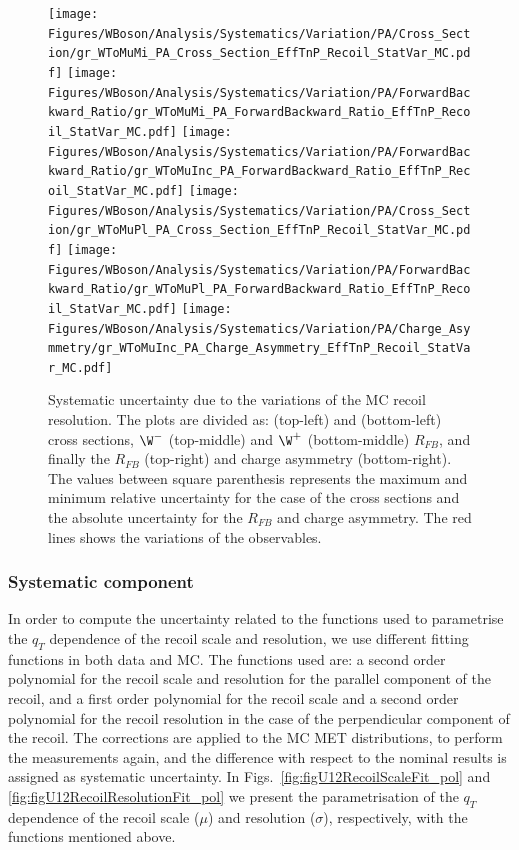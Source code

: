 \begin{figure}[!htbp]
 \begin{center}
  \texttt{[image: Figures/WBoson/Analysis/Systematics/Variation/PA/Cross\_Section/gr\_WToMuMi\_PA\_Cross\_Section\_EffTnP\_Recoil\_StatVar\_MC.pdf]}
  \texttt{[image: Figures/WBoson/Analysis/Systematics/Variation/PA/ForwardBackward\_Ratio/gr\_WToMuMi\_PA\_ForwardBackward\_Ratio\_EffTnP\_Recoil\_StatVar\_MC.pdf]}
  \texttt{[image: Figures/WBoson/Analysis/Systematics/Variation/PA/ForwardBackward\_Ratio/gr\_WToMuInc\_PA\_ForwardBackward\_Ratio\_EffTnP\_Recoil\_StatVar\_MC.pdf]}
  \texttt{[image: Figures/WBoson/Analysis/Systematics/Variation/PA/Cross\_Section/gr\_WToMuPl\_PA\_Cross\_Section\_EffTnP\_Recoil\_StatVar\_MC.pdf]}
  \texttt{[image: Figures/WBoson/Analysis/Systematics/Variation/PA/ForwardBackward\_Ratio/gr\_WToMuPl\_PA\_ForwardBackward\_Ratio\_EffTnP\_Recoil\_StatVar\_MC.pdf]}
  \texttt{[image: Figures/WBoson/Analysis/Systematics/Variation/PA/Charge\_Asymmetry/gr\_WToMuInc\_PA\_Charge\_Asymmetry\_EffTnP\_Recoil\_StatVar\_MC.pdf]}
 \end{center}
 \caption{Systematic uncertainty due to the variations of the MC recoil resolution. The plots are divided as: \WToMuNuMi (top-left) and \WToMuNuPl (bottom-left) cross sections, $\W^{-}$ (top-middle) and $\W^{+}$ (bottom-middle) $R_{FB}$, and finally the \W $R_{FB}$ (top-right) and \W charge asymmetry (bottom-right). The values between square parenthesis represents the maximum and minimum relative uncertainty for the case of the cross sections and the absolute uncertainty for the $R_{FB}$ and charge asymmetry. The red lines shows the variations of the observables.}
 \label{fig:Recoil_StatVar_MC}
\end{figure}


\clearpage
\subsubsection{Systematic component}

In order to compute the uncertainty related to the functions used to parametrise the $q_{T}$ dependence of the recoil scale and resolution, we use different fitting functions in both data and MC. The functions used are: a second order polynomial for the recoil scale and resolution for the parallel component of the recoil, and a first order polynomial for the recoil scale and a second order polynomial for the recoil resolution in the case of the perpendicular component of the recoil. The corrections are applied to the MC MET distributions, to perform the measurements again, and the difference with respect to the nominal results is assigned as systematic uncertainty. In Figs.~\ref{fig:figU12RecoilScaleFit_pol} and \ref{fig:figU12RecoilResolutionFit_pol} we present the parametrisation of the $q_{T}$ dependence of the recoil scale ($\mu$) and resolution ($\sigma$), respectively, with the functions mentioned above.

